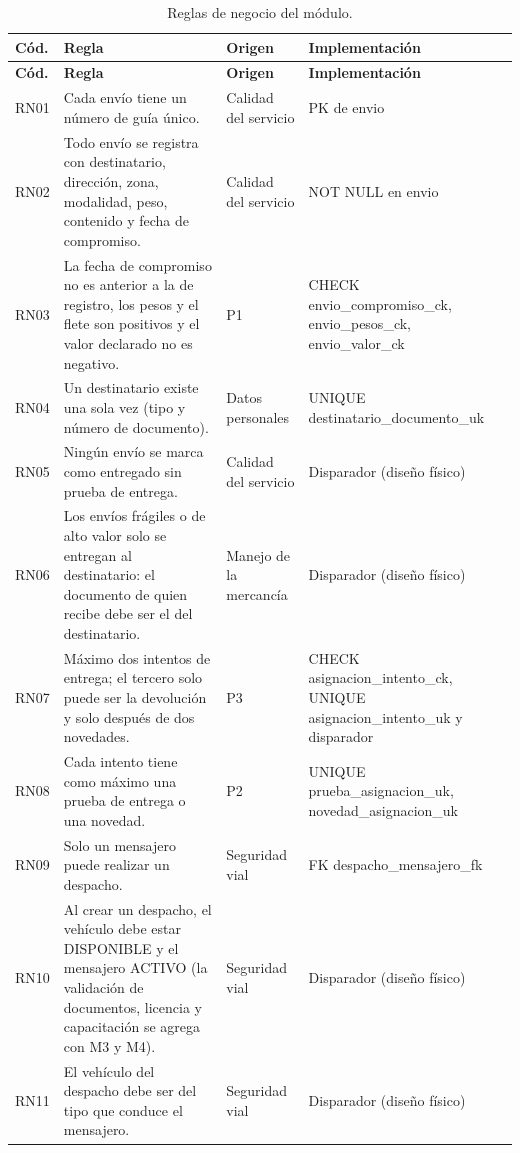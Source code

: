 {\singlespacing\small
\begin{longtable}{L{1.0cm} L{6.6cm} L{2.6cm} L{4.2cm}}
\caption{Reglas de negocio del módulo.}
\label{tab:reglasnegocio}\\
\toprule
\textbf{Cód.} & \textbf{Regla} & \textbf{Origen} & \textbf{Implementación} \\
\midrule
\endfirsthead
\toprule
\textbf{Cód.} & \textbf{Regla} & \textbf{Origen} & \textbf{Implementación} \\
\midrule
\endhead
\bottomrule
\endfoot
RN01 & Cada envío tiene un número de guía único. & Calidad del servicio & PK de envio \\
RN02 & Todo envío se registra con destinatario, dirección, zona, modalidad, peso, contenido y fecha de compromiso. & Calidad del servicio & NOT NULL en envio \\
RN03 & La fecha de compromiso no es anterior a la de registro, los pesos y el flete son positivos y el valor declarado no es negativo. & P1 & CHECK envio\_compromiso\_ck, envio\_pesos\_ck, envio\_valor\_ck \\
RN04 & Un destinatario existe una sola vez (tipo y número de documento). & Datos personales & UNIQUE destinatario\_documento\_uk \\
RN05 & Ningún envío se marca como entregado sin prueba de entrega. & Calidad del servicio & Disparador (diseño físico) \\
RN06 & Los envíos frágiles o de alto valor solo se entregan al destinatario: el documento de quien recibe debe ser el del destinatario. & Manejo de la mercancía & Disparador (diseño físico) \\
RN07 & Máximo dos intentos de entrega; el tercero solo puede ser la devolución y solo después de dos novedades. & P3 & CHECK asignacion\_intento\_ck, UNIQUE asignacion\_intento\_uk y disparador \\
RN08 & Cada intento tiene como máximo una prueba de entrega o una novedad. & P2 & UNIQUE prueba\_asignacion\_uk, novedad\_asignacion\_uk \\
RN09 & Solo un mensajero puede realizar un despacho. & Seguridad vial & FK despacho\_mensajero\_fk \\
RN10 & Al crear un despacho, el vehículo debe estar DISPONIBLE y el mensajero ACTIVO (la validación de documentos, licencia y capacitación se agrega con M3 y M4). & Seguridad vial & Disparador (diseño físico) \\
RN11 & El vehículo del despacho debe ser del tipo que conduce el mensajero. & Seguridad vial & Disparador (diseño físico) \\

\end{longtable}}
